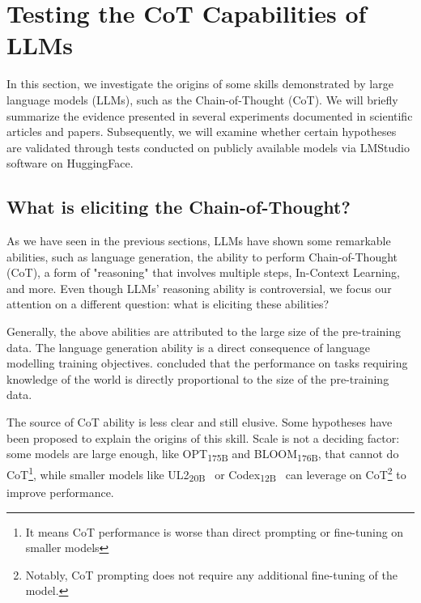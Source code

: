 
\section{Testing the CoT Capabilities of LLMs}
\label{ch:capabilities}


In this section, we investigate the origins of some skills demonstrated by large language models (LLMs), such as the Chain-of-Thought (CoT).
We will briefly summarize the evidence presented in several experiments documented in scientific articles and papers.
Subsequently, we will examine whether certain hypotheses are validated through tests conducted on publicly available models via LMStudio software on HuggingFace.

\subsection{What is eliciting the Chain-of-Thought?}
\label{sec:what-is-eliciting-the-chain-of-thought?}

As we have seen in the previous sections, LLMs have shown some remarkable abilities, such as language generation, the ability to perform Chain-of-Thought (CoT), a form of "reasoning" that involves multiple steps, In-Context Learning, and more.
Even though LLMs' reasoning ability is controversial, we focus our attention on a different question: what is eliciting these abilities?

Generally, the above abilities are attributed to the large size of the pre-training data.
The language generation ability is a direct consequence of language modelling training objectives.
\textcite{liang2022holistic} concluded that the performance on tasks requiring knowledge of the world is directly proportional to the size of the pre-training data.

The source of CoT ability is less clear and still elusive.
Some hypotheses have been proposed to explain the origins of this skill.
Scale is not a deciding factor: some models are large enough, like OPT\textsubscript{175B} and BLOOM\textsubscript{176B}, that cannot do CoT\footnote{It means CoT performance is worse than direct prompting or fine-tuning on smaller models}, while smaller models like UL2\textsubscript{20B}~\cite{tay2023ul2unifyinglanguagelearning} or Codex\textsubscript{12B}~\cite{chen2021evaluating} can leverage on CoT\footnote{Notably, CoT prompting does not require any additional fine-tuning of the model.} to improve performance.

